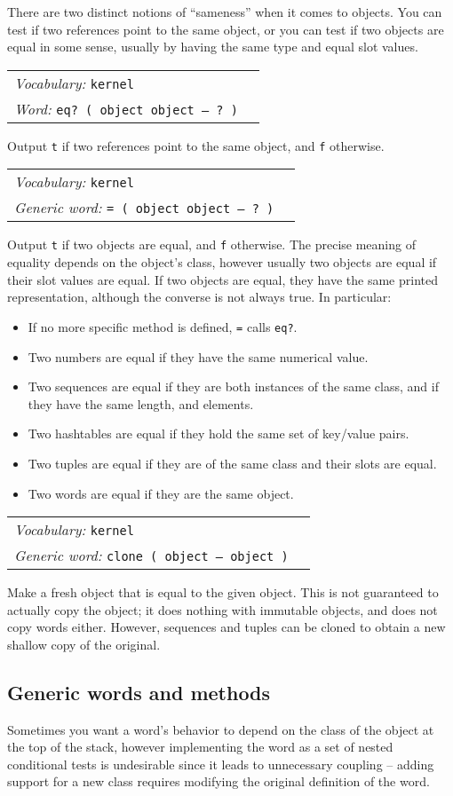 \documentclass{book}
\newcommand{\vocabulary}[1]{\emph{Vocabulary:} \texttt{#1}&\\}
\newcommand{\ordinaryword}[2]{\index{\texttt{#1}}\emph{Word:} \texttt{#2}&\\}
\newcommand{\genericword}[2]{\index{\texttt{#1}}\emph{Generic word:} \texttt{#2}&\\}
\newcommand{\wordtable}[1]{

\begin{tabularx}{12cm}[t]{lX}
\hline
#1
\hline
\end{tabularx}

}
\begin{document}
There are two distinct notions of ``sameness'' when it comes to objects. You can test if two references point to the same object, or you can test if two objects are equal in some sense, usually by having the same type and equal slot values.
\wordtable{
\vocabulary{kernel}
\ordinaryword{eq?}{eq?~( object object -- ?~)}
}
Output \texttt{t} if two references point to the same object, and \texttt{f} otherwise.
\wordtable{
\vocabulary{kernel}
\genericword{=}{= ( object object -- ?~)}
}
Output \texttt{t} if two objects are equal, and \texttt{f} otherwise. The precise meaning of equality depends on the object's class, however usually two objects are equal if their slot values are equal. If two objects are equal, they have the same printed representation, although the converse is not always true. In particular:
\begin{itemize}
\item If no more specific method is defined, \texttt{=} calls \texttt{eq?}.
\item Two numbers are equal if they have the same numerical value.
\item Two sequences are equal if they are both instances of the same class, and if they have the same length, and elements.
\item Two hashtables are equal if they hold the same set of key/value pairs.
\item Two tuples are equal if they are of the same class and their slots are equal.
\item Two words are equal if they are the same object.
\end{itemize}
\wordtable{
\vocabulary{kernel}
\genericword{clone}{clone ( object -- object )}
}
Make a fresh object that is equal to the given object. This is not guaranteed to actually copy the object; it does nothing with immutable objects, and does not copy words either. However, sequences and tuples can be cloned to obtain a new shallow copy of the original.

\subsection{Generic words and methods}

Sometimes  you want a word's behavior to depend on the class of the object at the top of the stack, however implementing the word as a set of nested conditional tests is undesirable since it leads to unnecessary coupling -- adding support for a new class requires modifying the original definition of the word.
\end{document}
